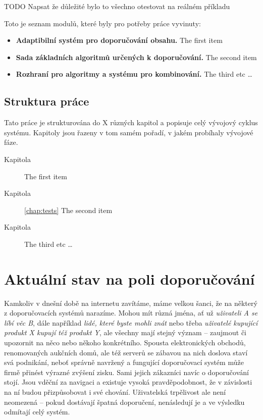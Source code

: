 \documentclass[thesis=M,czech]{FITthesis}[2014/05/07]
\begin{document}
\begin{introduction}
	TODO Napsat že důležité bylo to všechno otestovat na reálném příkladu
	
	Toto je seznam modulů, které byly pro potřeby práce vyvinuty:

\begin{itemize}
  \item \textbf{Adaptibilní systém pro doporučování obsahu.} The first item
  \item \textbf{Sada základních algoritmů určených k doporučování.} The second item
  \item \textbf{Rozhraní pro algoritmy a systému pro kombinování.} The third etc \ldots
\end{itemize}	

	\section{Struktura práce}
	Tato práce je strukturována do X různých kapitol a popisuje celý vývojový cyklus systému. Kapitoly jsou řazeny v tom samém pořadí, v jakém probíhaly vývojové fáze.	

\begin{description}
  \item[Kapitola]  The first item
  \item[Kapitola] \ref{chap:tests} The second item
  \item[Kapitola] The third etc \ldots
\end{description}
	
\end{introduction}
	
\chapter{Aktuální stav na poli doporučování}	
\label{chap:current}

Kamkoliv v dnešní době na internetu zavítáme, máme velkou šanci, že na některý z doporučovacích systémů narazíme. Mohou mít různá jména, ať už \emph{uživateli A se líbí věc B}, dále například \emph{lidé, které byste mohli znát} nebo třeba \emph{uživatelé kupující produkt X kupují též produkt Y}, ale všechny mají stejný význam – zaujmout či upozornit na něco nebo někoho konkrétního. Spousta elektronických obchodů, renomovaných aukčních domů, ale též serverů se zábavou na nich doslova staví svá podnikání, neboť správně navržený a fungující doporučovací systém může firmě přinést výrazné zvýšení zisku. 
Sami jejich zákazníci navíc o doporučování stojí. Jsou vděční za navigaci a existuje vysoká pravděpodobnost, že v závislosti na ní budou přizpůsobovat i své chování. Uživatelská trpělivost ale není neomezená – pokud dostávají špatná doporučení, nenásledují je a ve výsledku odmítají celý systém.
\end{document}
